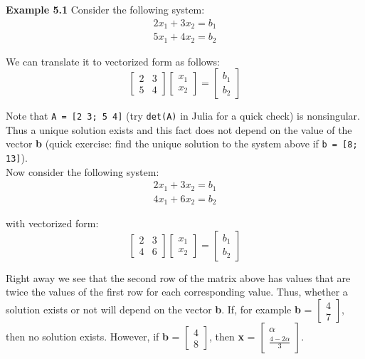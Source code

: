 \documentclass[11pt,a4paper,oneside]{report}
\begin{document}
\begin{framed}
{\bf Example 5.1 } Consider the following system:
\begin{eqnarray*}
2x_1 + 3x_2 = b_1 \\
5x_1 + 4x_2 = b_2
\end{eqnarray*}

We can translate it to vectorized form as follows:
\[
\begin{bmatrix}
2 & 3 \\
5 & 4
\end{bmatrix}
\begin{bmatrix}
x_1 \\
x_2
\end{bmatrix}
=
\begin{bmatrix}
b_1\\
b_2
\end{bmatrix}
\]

Note that \verb+A = [2 3; 5 4]+ (try \verb+det(A)+ in Julia for a quick check) is nonsingular. Thus a unique solution exists and this fact does not depend on the value of the vector {\bf b} (quick exercise: find the unique solution to the system above if \verb+b = [8; 13]+). \\

Now consider the following system:
\begin{eqnarray*}
2x_1 + 3x_2 = b_1 \\
4x_1 + 6x_2 = b_2
\end{eqnarray*}

with vectorized form:
\[
\begin{bmatrix}
2 & 3 \\
4 & 6
\end{bmatrix}
\begin{bmatrix}
x_1 \\
x_2
\end{bmatrix}
=
\begin{bmatrix}
b_1\\
b_2
\end{bmatrix}
\]

Right away we see that the second row of the matrix above has values that are twice the values of the first row for each corresponding value. Thus, whether a solution exists or not will depend on the vector {\bf b}. If, for example {\bf b} = $\begin{bmatrix} 4\\ 7\end{bmatrix}$, then  no solution exists. However, if {\bf b} = $\begin{bmatrix} 4\\ 8\end{bmatrix}$, then {\bf x} = $\begin{bmatrix} \alpha \\ \frac{4 - 2\alpha}{3}\end{bmatrix}$.
\end{framed}
\end{document}
